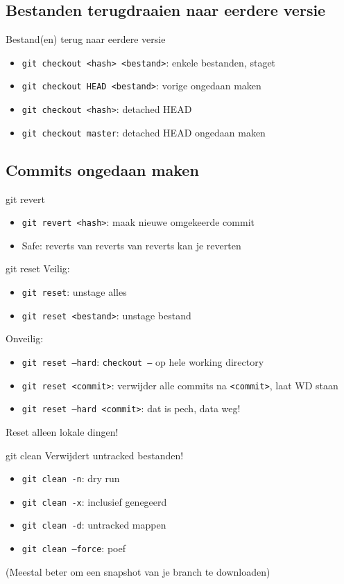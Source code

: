 \subsection{Bestanden terugdraaien naar eerdere versie}
\begin{frame}{Bestand(en) terug naar eerdere versie}
	\begin{itemize}
		\item \texttt{git checkout <hash> <bestand>}: enkele bestanden, staget
		\item \texttt{git checkout HEAD <bestand>}: vorige ongedaan maken
		\item \texttt{git checkout <hash>}: detached HEAD
		\item \texttt{git checkout master}: detached HEAD ongedaan maken
	\end{itemize}
\end{frame}

\subsection{Commits ongedaan maken}
\begin{frame}{git revert}
	\begin{itemize}
		\item \texttt{git revert <hash>}: maak nieuwe omgekeerde commit
		\item Safe: reverts van reverts van reverts kan je reverten
	\end{itemize}
\end{frame}

\begin{frame}{git reset}
	Veilig:
	\begin{itemize}
		\item \texttt{git reset}: unstage alles
		\item \texttt{git reset <bestand>}: unstage bestand
	\end{itemize}
	\alert{Onveilig:}
	\begin{itemize}
		\item \texttt{git reset --hard}: \texttt{checkout --} op hele working directory
		\item \texttt{git reset <commit>}: verwijder alle commits na \texttt{<commit>}, laat WD staan
		\item \texttt{git reset --hard <commit>}: \alert{dat is pech, data weg!}
	\end{itemize}
	\alert{Reset alleen lokale dingen!}
\end{frame}

\begin{frame}{git clean}
	\alert{Verwijdert untracked bestanden!}
	\begin{itemize}
		\item \texttt{git clean -n}: dry run
		\item \texttt{git clean -x}: inclusief genegeerd
		\item \texttt{git clean -d}: untracked mappen
		\item \texttt{git clean --force}: \alert{poef}
	\end{itemize}
	(Meestal beter om een snapshot van je branch te downloaden)
\end{frame}
